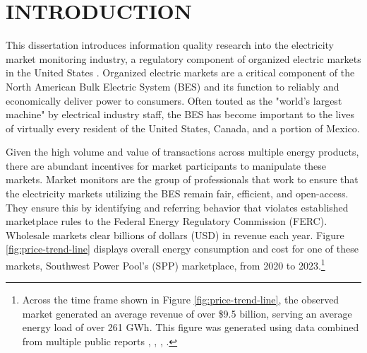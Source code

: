 %
%
%
%  
%



\pagestyle{plain} %
\setcounter{page}{1}


\chapter{\uppercase {Introduction}}
\label{cha:Introduction}
This dissertation introduces information quality research into the electricity market monitoring industry, a regulatory component of organized electric markets in the United States \cite{ferc1}. Organized electric markets are a critical component of the North American Bulk Electric System (BES) and its function to reliably and economically deliver power to consumers. Often touted as the "world's largest machine" \cite{stenvignils} by electrical industry staff, the BES has become important to the lives of virtually every resident of the United States, Canada, and a portion of Mexico.

Given the high volume and value of transactions across multiple energy products, there are abundant incentives for market participants to manipulate these markets. Market monitors are the group of professionals that work to ensure that the electricity markets utilizing the BES remain fair, efficient, and open-access. They ensure this by identifying and referring behavior that violates established marketplace rules to the Federal Energy Regulatory Commission (FERC). Wholesale markets clear billions of dollars (USD) in revenue each year. Figure \ref{fig:price-trend-line} displays overall energy consumption and cost for one of these markets, Southwest Power Pool's (SPP) marketplace, from 2020 to 2023.\footnote{Across the time frame shown in Figure \ref{fig:price-trend-line}, the observed market generated an average revenue of over \$9.5 billion, serving an average energy load of over 261 GWh. This figure was generated using data combined from multiple public reports \cite{spp-asom-2023}, \cite{spp-asom-2022}, \cite{spp-asom-2021}, \cite{spp-asom-2020}.}

